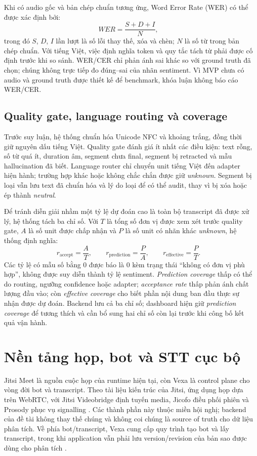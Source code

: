 Khi có audio gốc và bản chép chuẩn tương ứng, Word Error Rate (WER) có thể được xác định bởi:
\begin{equation}
  WER = \frac{S + D + I}{N},
\end{equation}
trong đó $S$, $D$, $I$ lần lượt là số lỗi thay thế, xóa và chèn; $N$ là số từ trong bản chép chuẩn. Với tiếng Việt, việc định nghĩa token và quy tắc tách từ phải được cố định trước khi so sánh. WER/CER chỉ phản ánh sai khác so với ground truth đã chọn; chúng không trực tiếp đo đúng--sai của nhãn sentiment. Vì MVP chưa có audio và ground truth được thiết kế để benchmark, khóa luận không báo cáo WER/CER.

\subsection{Quality gate, language routing và coverage}
Trước suy luận, hệ thống chuẩn hóa Unicode NFC và khoảng trắng, đồng thời giữ nguyên dấu tiếng Việt. Quality gate đánh giá ít nhất các điều kiện: text rỗng, số từ quá ít, duration âm, segment chưa final, segment bị retracted và mẫu hallucination đã biết. Language router chỉ chuyển unit tiếng Việt đến adapter hiện hành; trường hợp khác hoặc không chắc chắn được giữ \textit{unknown}. Segment bị loại vẫn lưu text đã chuẩn hóa và lý do loại để có thể audit, thay vì bị xóa hoặc ép thành \textit{neutral}.

Để tránh diễn giải nhầm một tỷ lệ dự đoán cao là toàn bộ transcript đã được xử lý, hệ thống tách ba chỉ số. Với $T$ là tổng số đơn vị được xem xét trước quality gate, $A$ là số unit được chấp nhận và $P$ là số unit có nhãn khác \textit{unknown}, hệ thống định nghĩa:
\begin{equation}
  r_{\mathrm{accept}}=\frac{A}{T},\qquad
  r_{\mathrm{prediction}}=\frac{P}{A},\qquad
  r_{\mathrm{effective}}=\frac{P}{T}.
\end{equation}
Các tỷ lệ có mẫu số bằng 0 được báo là $0$ kèm trạng thái ``không có đơn vị phù hợp'', không được suy diễn thành tỷ lệ sentiment. \emph{Prediction coverage} thấp có thể do routing, ngưỡng confidence hoặc adapter; \emph{acceptance rate} thấp phản ánh chất lượng đầu vào; còn \emph{effective coverage} cho biết phần nội dung ban đầu thực sự nhận được dự đoán. Backend lưu cả ba chỉ số; dashboard hiện giữ \emph{prediction coverage} để tương thích và cần bổ sung hai chỉ số còn lại trước khi công bố kết quả vận hành.

\section{Nền tảng họp, bot và STT cục bộ}
Jitsi Meet là nguồn cuộc họp của runtime hiện tại, còn Vexa là control plane cho vòng đời bot và transcript. Theo tài liệu kiến trúc của Jitsi, ứng dụng họp dựa trên WebRTC, với Jitsi Videobridge định tuyến media, Jicofo điều phối phiên và Prosody phục vụ signalling \cite{jitsiArchitecture2026}. Các thành phần này thuộc miền hội nghị; backend của đề tài không thay thế chúng và không coi chúng là source of truth cho dữ liệu phân tích. Về phía bot/transcript, Vexa cung cấp quy trình tạo bot và lấy transcript, trong khi application vẫn phải lưu version/revision của bản sao được dùng cho phân tích \cite{vexaQuickstart2026}.

